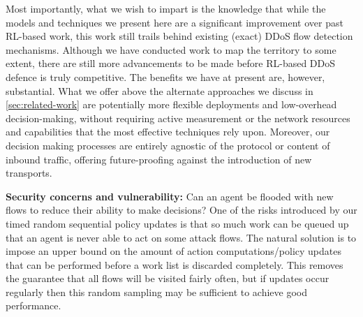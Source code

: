 \documentclass[conference, letterpaper, 10pt, times]{IEEEtran}
\newcommand{\fakepara}[1]{\noindent\textbf{#1:}}
\begin{document}

Most importantly, what we wish to impart is the knowledge that while the models and techniques we present here are a significant improvement over past RL-based work, this work still trails behind existing (exact) DDoS flow detection mechanisms.
Although we have conducted work to map the territory to some extent, there are still more advancements to be made before RL-based DDoS defence is truly competitive.
The benefits we have at present are, however, substantial.
What we offer above the alternate approaches we discuss in \cref{sec:related-work} are potentially more flexible deployments and low-overhead decision-making, without requiring active measurement or the network resources and capabilities that the most effective techniques rely upon.
Moreover, our decision making processes are entirely agnostic of the protocol or content of inbound traffic, offering future-proofing against the introduction of new transports.

\fakepara{Security concerns and vulnerability}
Can an agent be flooded with new flows to reduce their ability to make decisions?
One of the risks introduced by our timed random sequential policy updates is that so much work can be queued up that an agent is never able to act on some attack flows.
The natural solution is to impose an upper bound on the amount of action computations/policy updates that can be performed before a work list is discarded completely.
This removes the guarantee that all flows will be visited fairly often, but if updates occur regularly then this random sampling may be sufficient to achieve good performance.
\end{document}
